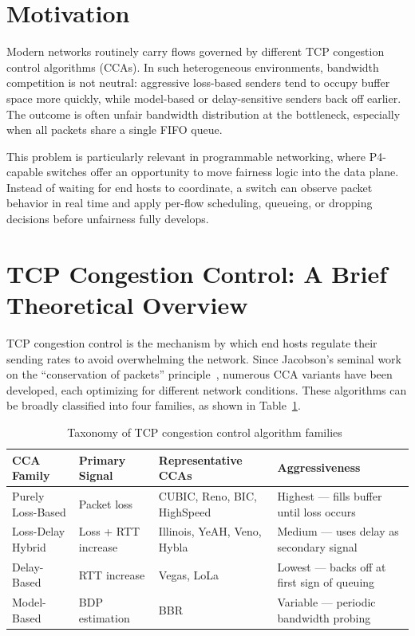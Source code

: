 \documentclass[12pt,a4paper]{report}
\begin{document}
\section{Motivation}
Modern networks routinely carry flows governed by different TCP congestion control algorithms (CCAs). In such heterogeneous environments, bandwidth competition is not neutral: aggressive loss-based senders tend to occupy buffer space more quickly, while model-based or delay-sensitive senders back off earlier. The outcome is often unfair bandwidth distribution at the bottleneck, especially when all packets share a single FIFO queue.

This problem is particularly relevant in programmable networking, where P4-capable switches offer an opportunity to move fairness logic into the data plane. Instead of waiting for end hosts to coordinate, a switch can observe packet behavior in real time and apply per-flow scheduling, queueing, or dropping decisions before unfairness fully develops.

\section{TCP Congestion Control: A Brief Theoretical Overview}
TCP congestion control is the mechanism by which end hosts regulate their sending rates to avoid overwhelming the network. Since Jacobson's seminal work on the ``conservation of packets'' principle~\cite{jacobson88}, numerous CCA variants have been developed, each optimizing for different network conditions. These algorithms can be broadly classified into four families, as shown in Table~\ref{tab:cca_families}.

\begin{table}[H]
\centering
\caption{Taxonomy of TCP congestion control algorithm families~\cite{p4air,p4cci}}
\label{tab:cca_families}
\renewcommand{\arraystretch}{1.35}
\begin{tabularx}{\textwidth}{@{}p{2.8cm}p{3.2cm}p{3.5cm}X@{}}
\toprule
\textbf{CCA Family} & \textbf{Primary Signal} & \textbf{Representative CCAs} & \textbf{Aggressiveness} \\
\midrule
Purely Loss-Based & Packet loss & CUBIC, Reno, BIC, HighSpeed & Highest — fills buffer until loss occurs \\
Loss-Delay Hybrid & Loss + RTT increase & Illinois, YeAH, Veno, Hybla & Medium — uses delay as secondary signal \\
Delay-Based & RTT increase & Vegas, LoLa & Lowest — backs off at first sign of queuing \\
Model-Based & BDP estimation & BBR & Variable — periodic bandwidth probing \\
\bottomrule
\end{tabularx}
\end{table}
\end{document}
